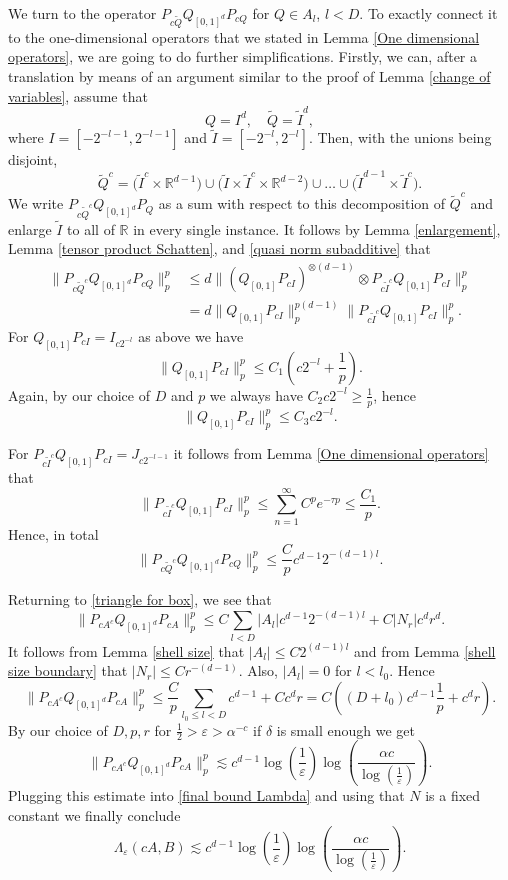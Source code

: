 \documentclass[12pt]{amsart}
\numberwithin{equation}{section}
\newcommand{\R}{\mathbb{R}}
\newcommand{\eps}{\varepsilon}
\begin{document}
We turn to the operator $P_{c\tilde{Q}} Q_{[0,1]^d} P_{cQ}$ for $Q\in A_l$, $l<D$. To exactly connect it to the one-dimensional operators that we stated in Lemma \ref{One dimensional operators}, we are going to do further simplifications. Firstly, we can, after a translation by means of an argument similar to the proof of Lemma \ref{change of variables}, assume that
\[
Q = I^d , \quad \tilde{Q} = \tilde{I}^d,
\]
where $I = [-2^{-l-1},2^{-l-1}]$ and $\tilde{I} = [-2^{-l},  2^{-l}]$. Then, with the unions being disjoint, 
\[
\tilde{Q}^c = \big(\tilde{I}^{c} \times \R^{d-1}\big) \cup (\tilde{I} \times \tilde{I}^c \times \R^{d-2} \big) \cup \dots \cup \big(\tilde{I}^{d-1} \times \tilde{I}^c\big).
\]
We write $P_{c\tilde{Q}^c}Q_{[0,1]^d}P_Q$ as a sum with respect to this decomposition of $\tilde{Q}^c$ and enlarge $\tilde{I}$ to all of $\R$ in every single instance. It follows by Lemma \ref{enlargement}, Lemma \ref{tensor product Schatten}, and \eqref{quasi norm subadditive} that
\begin{align*}
\|P_{c\tilde{Q}^c} Q_{[0,1]^d} P_{cQ}\|^p_p &\leq d \|\left(Q_{[0,1]} P_{cI}\right)^{\otimes (d-1)} \otimes P_{c\tilde{I}^c} Q_{[0,1]} P_{cI}\|^p_p\\
& = d \| Q_{[0,1]} P_{cI}\|_p^{p(d-1)} \|P_{c\tilde{I}^c} Q_{[0,1]} P_{cI}\|^p_p.
\end{align*}
For $Q_{[0,1]}P_{cI} = I_{c 2^{-l}}$ as above we have
$$\| Q_{[0,1]} P_{cI}\|_p^{p}\le C_1\left(c2^{-l}+\frac{1}{p}\right).$$
Again, by our choice of $D$ and $p$ we always have $C_2 c2^{-l} \ge \frac{1}{p}$, hence $$\| Q_{[0,1]} P_{cI}\|_p^{p}\le C_3 c2^{-l}.$$

For $P_{c\tilde{I}^c} Q_{[0,1]} P_{cI} = J_{c2^{-l-1}}$ it follows from Lemma \ref{One dimensional operators} that
$$\|P_{c\tilde{I}^c} Q_{[0,1]} P_{cI}\|_p^p \le \sum_{n=1}^\infty C^p e^{-\tau p} \le \frac{C_1}{p}.$$
Hence, in total
$$\|P_{c\tilde{Q}^c} Q_{[0,1]^d} P_{cQ}\|^p_p \le \frac{C}{p}c^{d-1}2^{-(d-1)l}.$$

Returning to \eqref{triangle for box}, we see that 
$$\|P_{cA^c}Q_{[0,1]^d}P_{cA}\|^p_p\le C\sum_{l < D} |A_l| c^{d-1}2^{-(d-1)l} + C|N_r|c^d r^d.$$
It follows from Lemma \ref{shell size} that $|A_l| \leq C 2^{(d-1)l}$ and from Lemma \ref{shell size boundary} that $|N_r| \leq C r^{-(d-1)}$. Also, $|A_l| = 0$ for $l < l_0$. Hence
$$\|P_{cA^c}Q_{[0,1]^d}P_{cA}\|^p_p \le \frac{C}{p}\sum_{l_0\le l < D}c^{d-1} + Cc^d r = C\left((D+l_0)c^{d-1}\frac{1}{p} + c^dr\right).$$
By our choice of $D, p, r$ for $\frac{1}{2} > \eps > \alpha^{-c}$ if $\delta$ is small enough we get
\begin{equation}\label{Shatten norm final bound}
\|P_{cA^c}Q_{[0,1]^d}P_{cA}\|^p_p\lesssim c^{d-1}\log\left(\frac{1}{\eps}\right)\log\left(\frac{\alpha c}{\log\left(\frac{1}{\eps}\right)}\right).
\end{equation}
Plugging this estimate into \eqref{final bound Lambda} and using that $N$ is a fixed constant we finally conclude
$$\Lambda_\eps(cA, B)\lesssim c^{d-1}\log\left(\frac{1}{\eps}\right)\log\left(\frac{\alpha c}{\log\left(\frac{1}{\eps}\right)}\right).$$
\end{document}

